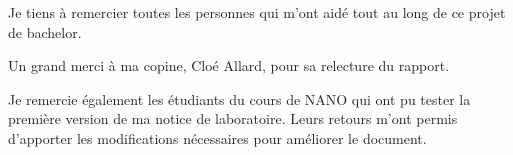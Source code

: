Je tiens à remercier toutes les personnes qui m'ont aidé tout au long de ce projet de bachelor.

Un grand merci à ma copine, Cloé Allard, pour sa relecture du rapport.

Je remercie également les étudiants du cours de NANO qui ont pu tester la première version de ma notice de laboratoire. Leurs retours m'ont permis d'apporter les modifications nécessaires pour améliorer le document.
